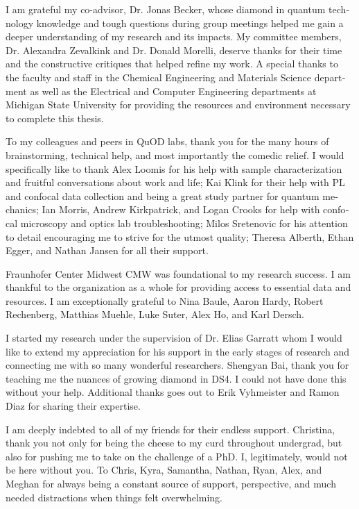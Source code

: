 \documentclass{msuphddissertation_ssn}
\begin{document}
\begin{otherlanguage}{english}
\begin{acknowledgment}
I am grateful my co-advisor, Dr. Jonas Becker, whose diamond in quantum technology knowledge and tough questions during group meetings helped me gain a deeper understanding of my research and its impacts. My committee members, Dr. Alexandra Zevalkink and Dr. Donald Morelli, deserve thanks for their time and the constructive critiques that helped refine my work. A special thanks to the faculty and staff in the Chemical Engineering and Materials Science department as well as the Electrical and Computer Engineering departments at Michigan State University for providing the resources and environment necessary to complete this thesis.

To my colleagues and peers in QuOD labs, thank you for the many hours of brainstorming, technical help, and most importantly the comedic relief. I would specifically like to thank Alex Loomis for his help with sample characterization and fruitful conversations about work and life; Kai Klink for their help with PL and confocal data collection and being a great study partner for quantum mechanics; Ian Morris, Andrew Kirkpatrick, and Logan Crooks for help with confocal microscopy and optics lab troubleshooting; Milos Sretenovic for his attention to detail encouraging me to strive for the utmost quality; Theresa Alberth, Ethan Egger, and Nathan Jansen for all their support.

Fraunhofer Center Midwest CMW was foundational to my research success. I am thankful to the organization as a whole for providing access to essential data and resources. I am exceptionally grateful to Nina Baule, Aaron Hardy, Robert Rechenberg, Matthias Muehle, Luke Suter, Alex Ho, and Karl Dersch.

I started my research under the supervision of Dr. Elias Garratt whom I would like to extend my appreciation for his support in the early stages of research and connecting me with so many wonderful researchers. Shengyan Bai, thank you for teaching me the nuances of growing diamond in DS4. I could not have done this without your help. Additional thanks goes out to Erik Vyhmeister and Ramon Diaz for sharing their expertise. 

I am deeply indebted to all of my friends for their endless support. Christina, thank you not only for being the cheese to my curd throughout undergrad, but also for pushing me to take on the challenge of a PhD. I, legitimately, would not be here without you. To Chris, Kyra, Samantha, Nathan, Ryan, Alex, and Meghan for always being a constant source of support, perspective, and much needed distractions when things felt overwhelming.


\end{acknowledgment}
\end{otherlanguage}
\end{document}
